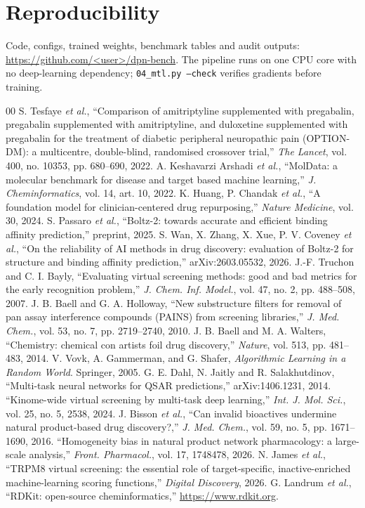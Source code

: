 \documentclass[conference]{IEEEtran}
\begin{document}
\section*{Reproducibility}
Code, configs, trained weights, benchmark tables and audit outputs:
\url{https://github.com/<user>/dpn-bench}. The pipeline runs on one CPU core
with no deep-learning dependency; \texttt{04\_mtl.py --check} verifies gradients
before training.

\begin{thebibliography}{00}
 S. Tesfaye \textit{et al.}, ``Comparison of amitriptyline supplemented with pregabalin, pregabalin supplemented with amitriptyline, and duloxetine supplemented with pregabalin for the treatment of diabetic peripheral neuropathic pain (OPTION-DM): a multicentre, double-blind, randomised crossover trial,'' \textit{The Lancet}, vol. 400, no. 10353, pp. 680--690, 2022.
 A. Keshavarzi Arshadi \textit{et al.}, ``MolData: a molecular benchmark for disease and target based machine learning,'' \textit{J. Cheminformatics}, vol. 14, art. 10, 2022.
 K. Huang, P. Chandak \textit{et al.}, ``A foundation model for clinician-centered drug repurposing,'' \textit{Nature Medicine}, vol. 30, 2024.
 S. Passaro \textit{et al.}, ``Boltz-2: towards accurate and efficient binding affinity prediction,'' preprint, 2025.
 S. Wan, X. Zhang, X. Xue, P. V. Coveney \textit{et al.}, ``On the reliability of AI methods in drug discovery: evaluation of Boltz-2 for structure and binding affinity prediction,'' arXiv:2603.05532, 2026.
 J.-F. Truchon and C. I. Bayly, ``Evaluating virtual screening methods: good and bad metrics for the early recognition problem,'' \textit{J. Chem. Inf. Model.}, vol. 47, no. 2, pp. 488--508, 2007.
 J. B. Baell and G. A. Holloway, ``New substructure filters for removal of pan assay interference compounds (PAINS) from screening libraries,'' \textit{J. Med. Chem.}, vol. 53, no. 7, pp. 2719--2740, 2010.
 J. B. Baell and M. A. Walters, ``Chemistry: chemical con artists foil drug discovery,'' \textit{Nature}, vol. 513, pp. 481--483, 2014.
 V. Vovk, A. Gammerman, and G. Shafer, \textit{Algorithmic Learning in a Random World}. Springer, 2005.
 G. E. Dahl, N. Jaitly and R. Salakhutdinov, ``Multi-task neural networks for QSAR predictions,'' arXiv:1406.1231, 2014.
 ``Kinome-wide virtual screening by multi-task deep learning,'' \textit{Int. J. Mol. Sci.}, vol. 25, no. 5, 2538, 2024.
 J. Bisson \textit{et al.}, ``Can invalid bioactives undermine natural product-based drug discovery?,'' \textit{J. Med. Chem.}, vol. 59, no. 5, pp. 1671--1690, 2016.
 ``Homogeneity bias in natural product network pharmacology: a large-scale analysis,'' \textit{Front. Pharmacol.}, vol. 17, 1748478, 2026.
 N. James \textit{et al.}, ``TRPM8 virtual screening: the essential role of target-specific, inactive-enriched machine-learning scoring functions,'' \textit{Digital Discovery}, 2026.
 G. Landrum \textit{et al.}, ``RDKit: open-source cheminformatics,'' \url{https://www.rdkit.org}.
\end{thebibliography}
\end{document}
